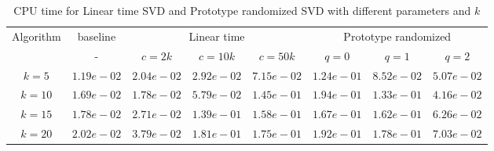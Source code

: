 \begin{table}\label{time1}
\centering
\begin{tabular}{|c|c|c|c|c|c|c|c|}

\hline
\multirow{2}{*}{ Algorithm} &\multicolumn{1}{c|}{baseline} &\multicolumn{3}{c|}{Linear time} &\multicolumn{3}{c|}{Prototype randomized}\\\cline{2-8}
 &- &$c=2k$ &$c=10k$ &$c=50k$ &$q=0$ &$q=1$ &$q=2$\\\hline
$k=5$ & $1.19e-02$ & $2.04e-02$ & $2.92e-02$ & $7.15e-02$ & $1.24e-01$ & $8.52e-02$ & $5.07e-02$\\\hline
$k=10$ & $1.69e-02$ & $1.78e-02$ & $5.79e-02$ & $1.45e-01$ & $1.94e-01$ & $1.33e-01$ & $4.16e-02$\\\hline
$k=15$ & $1.78e-02$ & $2.71e-02$ & $1.39e-01$ & $1.58e-01$ & $1.67e-01$ & $1.62e-01$ & $6.26e-02$\\\hline
$k=20$ & $2.02e-02$ & $3.79e-02$ & $1.81e-01$ & $1.75e-01$ & $1.92e-01$ & $1.78e-01$ & $7.03e-02$\\\hline
\end{tabular}
\caption{CPU time for Linear time SVD and Prototype randomized SVD with different parameters and $k$}
\end{table}

